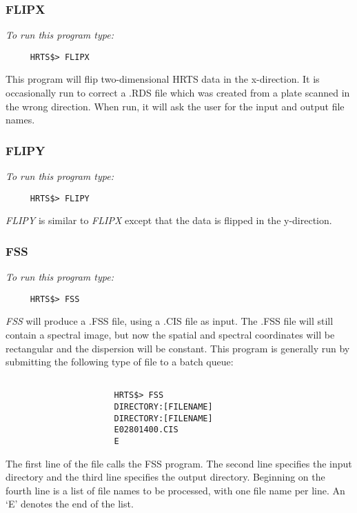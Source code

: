 \subsubsection{FLIPX}

{\em To run this program type:}
\begin{verbatim}
     HRTS$> FLIPX
\end{verbatim}
This program will flip two-dimensional HRTS data in the x-direction.
It is occasionally run to correct a .RDS file which was created from a plate
scanned in the wrong direction. When run, it will ask the user for the input
and output file names.

\subsubsection{FLIPY}

{\em To run this program type:}
\begin{verbatim}
     HRTS$> FLIPY
\end{verbatim}
{\em FLIPY} is similar to {\em FLIPX} except that the data is flipped in the
y-direction.

\subsubsection{FSS}

{\em To run this program type:}
\begin{verbatim}
     HRTS$> FSS
\end{verbatim}
{\em FSS} will produce a .FSS file, using a .CIS file as input.  The .FSS
   file will still contain a spectral image, but now the spatial and
   spectral coordinates will be rectangular and the dispersion will be
   constant.  This program is generally run by submitting the following
   type of file to a batch queue:
\begin{verbatim}

                      HRTS$> FSS
                      DIRECTORY:[FILENAME]
                      DIRECTORY:[FILENAME]
                      E02801400.CIS
                      E

\end{verbatim}

      The first line of the file calls the FSS program.  The second
   line specifies the input directory and the third line specifies the
   output directory.  Beginning on the fourth line is a list of file names
   to be processed, with one file name per line.  An `E' denotes the end
   of the list.

